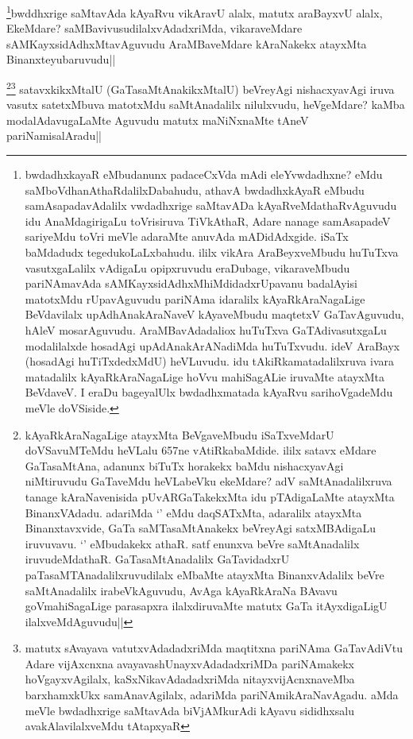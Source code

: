 \begin{artha}
\footnote{bwdadhxkayaR eMbudanunx padaceCxVda mAdi eleYvwdadhxne? eMdu saMboVdhanAthaRdalilxDabahudu, athavA bwdadhxkAyaR eMbudu samAsapadavAdalilx vwdadhxrige saMtavADa kAyaRveMdathaRvAguvudu idu AnaMdagirigaLu toVrisiruva TiVkAthaR, Adare nanage samAsapadeV sariyeMdu toVri meVle adaraMte anuvAda mADidAdxgide. iSaTx baMdadudx tegedukoLaLxbahudu. ililx vikAra AraBeyxveMbudu huTuTxva vasutxgaLalilx vAdigaLu opipxruvudu eraDubage, vikaraveMbudu pariNAmavAda sAMKayxsidAdhxMhiMdidadxrUpavanu badalAyisi matotxMdu rUpavAguvudu pariNAma idaralilx kAyaRkAraNagaLige BeVdavilalx upAdhAnakAraNaveV kAyaveMbudu maqtetxV GaTavAguvudu, hAleV mosarAguvudu. AraMBavAdadaliox huTuTxva GaTAdivasutxgaLu modalilalxde hosadAgi upAdAnakArANadiMda huTuTxvudu. ideV AraBayx (hosadAgi huTiTxdedxMdU) heVLuvudu. idu tAkiRkamatadalilxruva ivara matadalilx kAyaRkAraNagaLige hoVvu mahiSagALie iruvaMte atayxMta BeVdaveV. I eraDu bageyalUlx bwdadhxmatada kAyaRvu sarihoVgadeMdu meVle doVSiside.}\footnotemark bwddhxrige saMtavAda kAyaRvu vikAravU alalx, matutx araBayxvU alalx, EkeMdare? saMBavivusudilalxvAdadxriMda, vikaraveMdare sAMKayxsidAdhxMtavAguvudu AraMBaveMdare kAraNakekx atayxMta Binanxteyubaruvudu||
\end{artha}

\begin{artha}
\footnote{kAyaRkAraNagaLige atayxMta BeVgaveMbudu iSaTxveMdarU doVSavuMTeMdu heVLalu 657ne vAtiRkabaMdide. ililx satavx eMdare GaTasaMtAna, adanunx biTuTx horakekx baMdu nishacxyavAgi niMtiruvudu GaTaveMdu heVLabeVku ekeMdare? adV saMtAnadalilxruva tanage kAraNavenisida pUvARGaTakekxMta idu pTAdigaLaMte atayxMta BinanxVAdadu. adariMda `\stext' eMdu daqSATxMta, adaralilx atayxMta Binanxtavxvide, GaTa saMTasaMtAnakekx beVreyAgi satxMBAdigaLu iruvuvavu. `\stext' eMbudakekx athaR. satf enunxva beVre saMtAnadalilx iruvudeMdathaR. GaTasaMtAnadalilx GaTavidadxrU paTasaMTAnadalilxruvudilalx eMbaMte atayxMta BinanxvAdalilx beVre saMtAnadalilx irabeVkAguvudu, AvAga kAyaRkAraNa BAvavu goVmahiSagaLige parasapxra ilalxdiruvaMte matutx GaTa itAyxdigaLigU ilalxveMdAguvudu||}\footnote{matutx sAvayava vatutxvAdadadxriMda maqtitxna pariNAma GaTavAdiVtu Adare vijAxcnxna avayavashUnayxvAdadadxriMDa pariNAmakekx hoVgayxvAgilalx, kaSxNikavAdadadxriMda nitayxvijAcnxnaveMba barxhamxkUkx samAnavAgilalx, adariMda pariNAmikAraNavAgadu. aMda meVle bwdadhxrige saMtavAda biVjAMkurAdi kAyavu sididhxsalu avakAlavilalxveMdu tAtapxyaR} satavxkikxMtalU (GaTasaMtAnakikxMtalU) beVreyAgi nishacxyavAgi iruva vasutx satetxMbuva matotxMdu saMtAnadalilx nilulxvudu, heVgeMdare? kaMba modalAdavugaLaMte Aguvudu matutx maNiNxnaMte tAneV pariNamisalAradu||
\end{artha}

